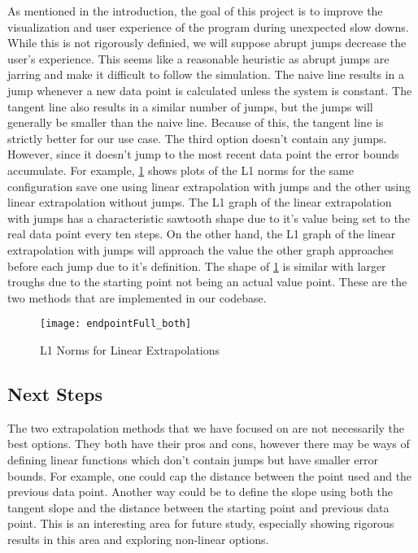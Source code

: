 As mentioned in the introduction, the goal of this project is to improve the visualization and user experience of the program during unexpected slow downs.
While this is not rigorously definied, we will suppose abrupt jumps decrease the user's experience.
This seems like a reasonable heuristic as abrupt jumps are jarring and make it difficult to follow the simulation.
The naive line results in a jump whenever a new data point is calculated unless the system is constant.
The tangent line also results in a similar number of jumps, but the jumps will generally be smaller than the naive line.
Because of this, the tangent line is strictly better for our use case.
The third option doesn't contain any jumps.
However, since it doesn't jump to the most recent data point the error bounds accumulate.
For example, \cref{fig:l1} shows plots of the L1 norms for the same configuration save one using linear extrapolation with jumps and the other using linear extrapolation without jumps.
The L1 graph of the linear extrapolation with jumps has a characteristic sawtooth shape due to it's value being set to the real data point every ten steps.
On the other hand, the L1 graph of the linear extrapolation with jumps will approach the value the other graph approaches before each jump due to it's definition.
The shape of \cref{fig:l1} is similar with larger troughs due to the starting point not being an actual value point.
These are the two methods that are implemented in our codebase.

\begin{figure}[H]
    \centering
    \texttt{[image: endpointFull\_both]}
    \caption{L1 Norms for Linear Extrapolations}%
    \label{fig:l1}
\end{figure}


\subsection{Next Steps}%
\label{sub:next_steps}

The two extrapolation methods that we have focused on are not necessarily the best options.
They both have their pros and cons, however there may be ways of defining linear functions which don't contain jumps but have smaller error bounds.
For example, one could cap the distance between the point used and the previous data point.
Another way could be to define the slope using both the tangent slope and the distance between the starting point and previous data point.
This is an interesting area for future study, especially showing rigorous results in this area and exploring non-linear options.
